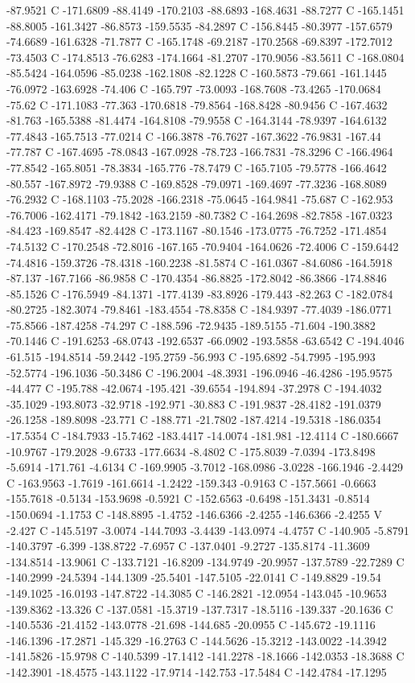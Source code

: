 {{{-87.9521 C -171.6809 -88.4149 -170.2103 -88.6893 -168.4631 -88.7277 C -165.1451 -88.8005 -161.3427 -86.8573 -159.5535 -84.2897 C -156.8445 -80.3977 -157.6579 -74.6689 -161.6328 -71.7877 C -165.1748 -69.2187 -170.2568 -69.8397 -172.7012 -73.4503 C -174.8513 -76.6283 -174.1664 -81.2707 -170.9056 -83.5611 C -168.0804 -85.5424 -164.0596 -85.0238 -162.1808 -82.1228 C -160.5873 -79.661 -161.1445 -76.0972 -163.6928 -74.406 C -165.797 -73.0093 -168.7608 -73.4265 -170.0684 -75.62 C -171.1083 -77.363 -170.6818 -79.8564 -168.8428 -80.9456 C -167.4632 -81.763 -165.5388 -81.4474 -164.8108 -79.9558 C -164.3144 -78.9397 -164.6132 -77.4843 -165.7513 -77.0214 C -166.3878 -76.7627 -167.3622 -76.9831 -167.44 -77.787 C -167.4695 -78.0843 -167.0928 -78.723 -166.7831 -78.3296 C -166.4964 -77.8542 -165.8051 -78.3834 -165.776 -78.7479 C -165.7105 -79.5778 -166.4642 -80.557 -167.8972 -79.9388 C -169.8528 -79.0971 -169.4697 -77.3236 -168.8089 -76.2932 C -168.1103 -75.2028 -166.2318 -75.0645 -164.9841 -75.687 C -162.953 -76.7006 -162.4171 -79.1842 -163.2159 -80.7382 C -164.2698 -82.7858 -167.0323 -84.423 -169.8547 -82.4428 C -173.1167 -80.1546 -173.0775 -76.7252 -171.4854 -74.5132 C -170.2548 -72.8016 -167.165 -70.9404 -164.0626 -72.4006 C -159.6442 -74.4816 -159.3726 -78.4318 -160.2238 -81.5874 C -161.0367 -84.6086 -164.5918 -87.137 -167.7166 -86.9858 C -170.4354 -86.8825 -172.8042 -86.3866 -174.8846 -85.1526 C -176.5949 -84.1371 -177.4139 -83.8926 -179.443 -82.263 C -182.0784 -80.2725 -182.3074 -79.8461 -183.4554 -78.8358 C -184.9397 -77.4039 -186.0771 -75.8566 -187.4258 -74.297 C -188.596 -72.9435 -189.5155 -71.604 -190.3882 -70.1446 C -191.6253 -68.0743 -192.6537 -66.0902 -193.5858 -63.6542 C -194.4046 -61.515 -194.8514 -59.2442 -195.2759 -56.993 C -195.6892 -54.7995 -195.993 -52.5774 -196.1036 -50.3486 C -196.2004 -48.3931 -196.0946 -46.4286 -195.9575 -44.477 C -195.788 -42.0674 -195.421 -39.6554 -194.894 -37.2978 C -194.4032 -35.1029 -193.8073 -32.9718 -192.971 -30.883 C -191.9837 -28.4182 -191.0379 -26.1258 -189.8098 -23.771 C -188.771 -21.7802 -187.4214 -19.5318 -186.0354 -17.5354 C -184.7933 -15.7462 -183.4417 -14.0074 -181.981 -12.4114 C -180.6667 -10.9767 -179.2028 -9.6733 -177.6634 -8.4802 C -175.8039 -7.0394 -173.8498 -5.6914 -171.761 -4.6134 C -169.9905 -3.7012 -168.0986 -3.0228 -166.1946 -2.4429 C -163.9563 -1.7619 -161.6614 -1.2422 -159.343 -0.9163 C -157.5661 -0.6663 -155.7618 -0.5134 -153.9698 -0.5921 C -152.6563 -0.6498 -151.3431 -0.8514 -150.0694 -1.1753 C -148.8895 -1.4752 -146.6366 -2.4255 -146.6366 -2.4255 V -2.427 C -145.5197 -3.0074 -144.7093 -3.4439 -143.0974 -4.4757 C -140.905 -5.8791 -140.3797 -6.399 -138.8722 -7.6957 C -137.0401 -9.2727 -135.8174 -11.3609 -134.8514 -13.9061 C -133.7121 -16.8209 -134.9749 -20.9957 -137.5789 -22.7289 C -140.2999 -24.5394 -144.1309 -25.5401 -147.5105 -22.0141 C -149.8829 -19.54 -149.1025 -16.0193 -147.8722 -14.3085 C -146.2821 -12.0954 -143.045 -10.9653 -139.8362 -13.326 C -137.0581 -15.3719 -137.7317 -18.5116 -139.337 -20.1636 C -140.5536 -21.4152 -143.0778 -21.698 -144.685 -20.0955 C -145.672 -19.1116 -146.1396 -17.2871 -145.329 -16.2763 C -144.5626 -15.3212 -143.0022 -14.3942 -141.5826 -15.9798 C -140.5399 -17.1412 -141.2278 -18.1666 -142.0353 -18.3688 C -142.3901 -18.4575 -143.1122 -17.9714 -142.753 -17.5484 C -142.4784 -17.1295 }}}

